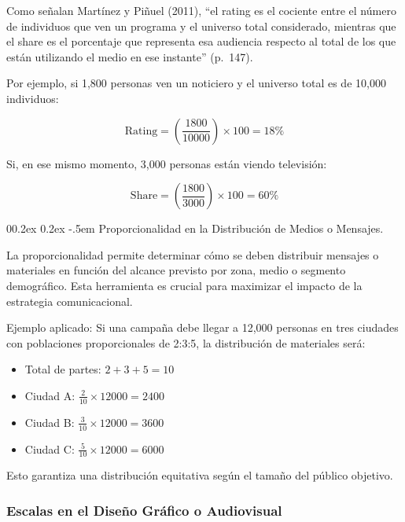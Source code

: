 \documentclass[
  stu,
  floatsintext,
  longtable,
  a4paper,
  nolmodern,
  notxfonts,
  notimes,
  colorlinks=true,linkcolor=blue,citecolor=blue,urlcolor=blue]{apa7}
\makeatletter
\renewcommand{\paragraph}{\@startsection{paragraph}{4}{\parindent}%
	{0\baselineskip \@plus 0.2ex \@minus 0.2ex}%
	{-.5em}%
	{\normalfont\normalsize\bfseries\typesectitle}}
\providecommand{\tightlist}{%
  \setlength{\itemsep}{0pt}\setlength{\parskip}{0pt}}
\makeatother
\begin{document}
Como señalan Martínez y Piñuel (2011), ``el rating es el cociente entre
el número de individuos que ven un programa y el universo total
considerado, mientras que el share es el porcentaje que representa esa
audiencia respecto al total de los que están utilizando el medio en ese
instante'' (p.~147).

Por ejemplo, si 1,800 personas ven un noticiero y el universo total es
de 10,000 individuos:

\[
\text{Rating} = \left( \frac{1800}{10000} \right) \times 100 = 18\%
\]

Si, en ese mismo momento, 3,000 personas están viendo televisión:

\[
\text{Share} = \left( \frac{1800}{3000} \right) \times 100 = 60\%
\]

\paragraph{Proporcionalidad en la Distribución de Medios o
Mensajes.}\label{proporcionalidad-en-la-distribuciuxf3n-de-medios-o-mensajes}

La proporcionalidad permite determinar cómo se deben distribuir mensajes
o materiales en función del alcance previsto por zona, medio o segmento
demográfico. Esta herramienta es crucial para maximizar el impacto de la
estrategia comunicacional.

Ejemplo aplicado: Si una campaña debe llegar a 12,000 personas en tres
ciudades con poblaciones proporcionales de 2:3:5, la distribución de
materiales será:

\begin{itemize}
\tightlist
\item
  Total de partes: \(2 + 3 + 5 = 10\)
\item
  Ciudad A: \(\frac{2}{10} \times 12000 = 2400\)
\item
  Ciudad B: \(\frac{3}{10} \times 12000 = 3600\)
\item
  Ciudad C: \(\frac{5}{10} \times 12000 = 6000\)
\end{itemize}

Esto garantiza una distribución equitativa según el tamaño del público
objetivo.

\subsubsection{Escalas en el Diseño Gráfico o
Audiovisual}\label{escalas-en-el-diseuxf1o-gruxe1fico-o-audiovisual}
\end{document}
